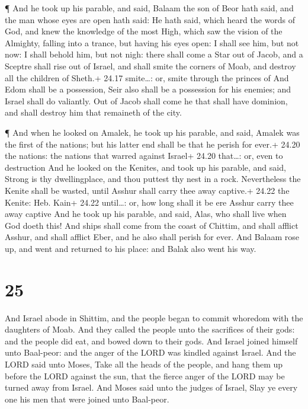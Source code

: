  ¶ And he took up his parable, and said, Balaam the son of
Beor hath said, and the man whose eyes are open hath said: 
He hath said, which heard the words of God, and knew the knowledge of
the most High, which saw the vision of the Almighty, falling into a
trance, but having his eyes open:  I shall see him, but not
now: I shall behold him, but not nigh: there shall come a Star out of
Jacob, and a Sceptre shall rise out of Israel, and shall smite the
corners of Moab, and destroy all the children of Sheth.+ 24.17
smite\ldots: or, smite through the princes of  And Edom
shall be a possession, Seir also shall be a possession for his enemies;
and Israel shall do valiantly.  Out of Jacob shall come he
that shall have dominion, and shall destroy him that remaineth of the
city.

 ¶ And when he looked on Amalek, he took up his parable,
and said, Amalek was the first of the nations; but his latter end shall
be that he perish for ever.+ 24.20 the nations: the nations that warred
against Israel+ 24.20 that\ldots: or, even to destruction 
And he looked on the Kenites, and took up his parable, and said, Strong
is thy dwellingplace, and thou puttest thy nest in a rock. 
Nevertheless the Kenite shall be wasted, until Asshur shall carry thee
away captive.+ 24.22 the Kenite: Heb. Kain+ 24.22 until\ldots: or, how
long shall it be ere Asshur carry thee away captive  And he
took up his parable, and said, Alas, who shall live when God doeth this!
 And ships shall come from the coast of Chittim, and shall
afflict Asshur, and shall afflict Eber, and he also shall perish for
ever.  And Balaam rose up, and went and returned to his
place: and Balak also went his way.

\hypertarget{section-24}{%
\section{25}\label{section-24}}

 And Israel abode in Shittim, and the people began to commit
whoredom with the daughters of Moab.  And they called the
people unto the sacrifices of their gods: and the people did eat, and
bowed down to their gods.  And Israel joined himself unto
Baal-peor: and the anger of the LORD was kindled against Israel.
 And the LORD said unto Moses, Take all the heads of the
people, and hang them up before the LORD against the sun, that the
fierce anger of the LORD may be turned away from Israel. 
And Moses said unto the judges of Israel, Slay ye every one his men that
were joined unto Baal-peor.

